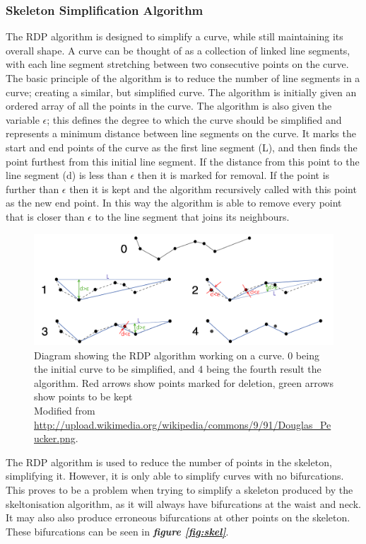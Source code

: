 \documentclass[a4paper, 12pt]{article}
\begin{document}
\subsubsection{Skeleton Simplification Algorithm}
	The RDP algorithm is designed to simplify a curve, while still maintaining its overall shape. A curve can be thought of as a collection of linked line segments, with each line segment stretching between two consecutive points on the curve. The basic principle of the algorithm is to reduce the number of line segments in a curve; creating a similar, but simplified curve. The algorithm is initially given an ordered array of all the points in the curve. The algorithm is also given the variable $\epsilon$; this defines the degree to which the curve should be simplified and represents a minimum distance between line segments on the curve. It marks the start and end points of the curve as the first line segment (L), and then finds the point furthest from this initial line segment. If the distance from this point to the line segment (d) is less than $\epsilon$ then it is marked for removal. If the point is further than $\epsilon$ then it is kept and the algorithm recursively called with this point as the new end point. In this way the algorithm is able to remove every point that is closer than $\epsilon$ to the line segment that joins its neighbours.
%
\begin{figure}[H]
	\centering
  	\includegraphics[width=\textwidth]{douglas_peucker.png}
  	\caption{Diagram showing the RDP algorithm working on a curve. 0 being the initial curve to be simplified, and 4 being the fourth result the algorithm. Red arrows show points marked for deletion, green arrows show points to be kept\\
  	Modified from \url{http://upload.wikimedia.org/wikipedia/commons/9/91/Douglas_Peucker.png}.}
  	\label{fig:douglas_peucker}
\end{figure}
%
\noindent The RDP algorithm is used to reduce the number of points in the skeleton, simplifying it.
However, it is only able to simplify curves with no bifurcations. This proves to be a problem when trying to simplify a skeleton produced by the skeltonisation algorithm, as it will always have bifurcations at the waist and neck. It may also also produce erroneous bifurcations at other points on the skeleton. These bifurcations can be seen in \textbf{\emph{figure \ref{fig:skel}}}.\\
\end{document}
